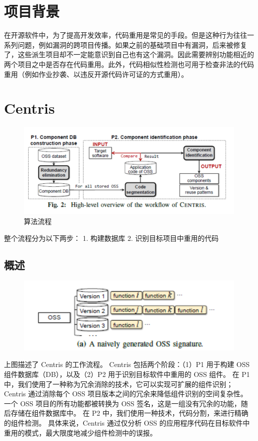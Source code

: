 \documentclass{cjc}
\begin{document}
\maketitle

\section{项目背景}

在开源软件中，为了提高开发效率，代码重用是常见的手段。但是这种行为往往一系列问题，例如漏洞的跨项目传播。如果之前的基础项目中有漏洞，后来被修复了，这些派生项目却不一定能意识到自己也有这个漏洞。因此需要辨别功能相近的两个项目之中是否存在代码重用。此外，代码相似性检测也可用于检查非法的代码重用（例如作业抄袭、以违反开源代码许可证的方式重用）。

\section{Centris}
\begin{figure}[htb]
  \centering
  \includegraphics[width=\linewidth]{pics/算法流程.png}
  \caption{算法流程}
\end{figure}
整个流程分为以下两步：
1. 构建数据库
2. 识别目标项目中重用的代码



\subsection{概述}
\begin{figure}[htb]
  \centering
  \includegraphics[width=\linewidth]{pics/image-20220622225558096.png}
\end{figure}
上图描述了 Centris 的工作流程。 Centris 包括两个阶段：（1）P1 用于构建 OSS 组件数据库（DB），以及（2）P2 用于识别目标软件中重用的 OSS 组件。 在 P1 中，我们使用了一种称为冗余消除的技术，它可以实现可扩展的组件识别； Centris 通过消除每个 OSS 项目版本之间的冗余来降低组件识别的空间复杂性。 一个 OSS 项目的所有功能都被转换为 OSS 签名，这是一组没有冗余的功能，随后存储在组件数据库中。 在 P2 中，我们使用一种技术，代码分割，来进行精确的组件检测。 具体来说，Centris 通过仅分析 OSS 的应用程序代码在目标软件中重用的模式，最大限度地减少组件检测中的误报。
\end{document}
